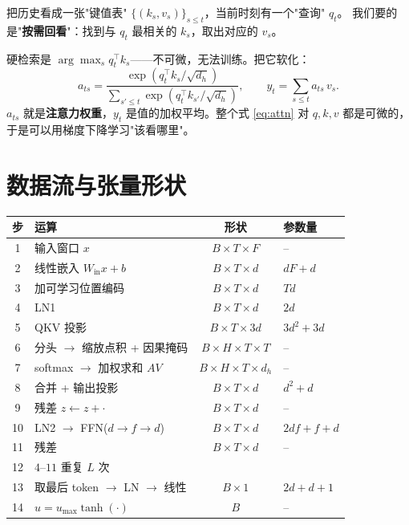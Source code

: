 把历史看成一张"键值表" $\{(k_s,v_s)\}_{s\le t}$，当前时刻有一个"查询" $q_t$。
我们要的是"\textbf{按需回看}"：找到与 $q_t$ 最相关的 $k_s$，取出对应的 $v_s$。

硬检索是 $\arg\max_s q_t^\top k_s$——不可微，无法训练。把它软化：
\begin{equation}
  a_{ts}=\frac{\exp(q_t^\top k_s/\sqrt{d_h})}{\sum_{s'\le t}\exp(q_t^\top k_{s'}/\sqrt{d_h})},
  \qquad
  y_t=\sum_{s\le t}a_{ts}\,v_s .
  \label{eq:attn}
\end{equation}
$a_{ts}$ 就是\textbf{注意力权重}，$y_t$ 是值的加权平均。整个式 \eqref{eq:attn} 对
$q,k,v$ 都是可微的，于是可以用梯度下降学习"该看哪里"。


\section{数据流与张量形状}

\begin{center}
\small
\begin{tabular}{@{}clcl@{}}
\toprule
步 & 运算 & 形状 & 参数量 \\
\midrule
1 & 输入窗口 $x$ & $B\times T\times F$ & -- \\
2 & 线性嵌入 $W_{\text{in}}x+b$ & $B\times T\times d$ & $dF+d$ \\
3 & 加可学习位置编码 & $B\times T\times d$ & $Td$ \\
4 & LN1 & $B\times T\times d$ & $2d$ \\
5 & QKV 投影 & $B\times T\times 3d$ & $3d^2+3d$ \\
6 & 分头 $\to$ 缩放点积 + 因果掩码 & $B\times H\times T\times T$ & -- \\
7 & softmax $\to$ 加权求和 $AV$ & $B\times H\times T\times d_h$ & -- \\
8 & 合并 + 输出投影 & $B\times T\times d$ & $d^2+d$ \\
9 & 残差 $z\leftarrow z+\cdot$ & $B\times T\times d$ & -- \\
10 & LN2 $\to$ FFN($d\to f\to d$) & $B\times T\times d$ & $2df+f+d$ \\
11 & 残差 & $B\times T\times d$ & -- \\
12 & $4$--$11$ 重复 $L$ 次 & & \\
13 & 取最后 token $\to$ LN $\to$ 线性 & $B\times 1$ & $2d+d+1$ \\
14 & $u=u_{\max}\tanh(\cdot)$ & $B$ & -- \\
\bottomrule
\end{tabular}
\end{center}

